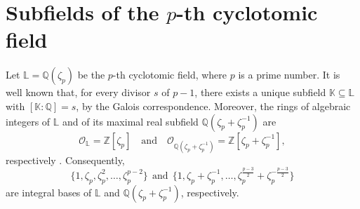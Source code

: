 \documentclass{amsart}
\begin{document}

\section{Subfields of the $p$-th cyclotomic field} \label{sec-2}

Let $\mathbb{L}=\mathbb{Q}(\zeta_p)$ be the $p$-th cyclotomic field, where $p$ is a prime number. It is well known that, for every divisor $s$ of $p-1$, there exists a unique subfield $\mathbb{K}\subseteq \mathbb{L}$
with $[\mathbb{K}:\mathbb{Q}]=s$, by the Galois correspondence. Moreover, the rings of algebraic integers of $\mathbb{L}$ and of its maximal real subfield $\mathbb{Q}(\zeta_p+\zeta_p^{-1})$ are
\[ \mathcal{O}_{\mathbb{L}}=\mathbb{Z}[\zeta_p] \quad\text{and}\quad \mathcal{O}_{\mathbb{Q}(\zeta_p+\zeta_p^{-1})} =\mathbb{Z}[\zeta_p+\zeta_p^{-1}], \]
respectively \cite{wash}. Consequently, \[ \{1,\zeta_p,\zeta_p^2,\ldots,\zeta_p^{p-2}\} \ \ \mbox{and} \ \ \{1,\zeta_p+\zeta_p^{-1},\ldots,\zeta_p^{\frac{p-3}{2}}+\zeta_p^{-\frac{p-3}{2}}\} \]
are integral bases of $\mathbb{L}$ and $\mathbb{Q}(\zeta_p+\zeta_p^{-1})$, respectively.
\end{document}
